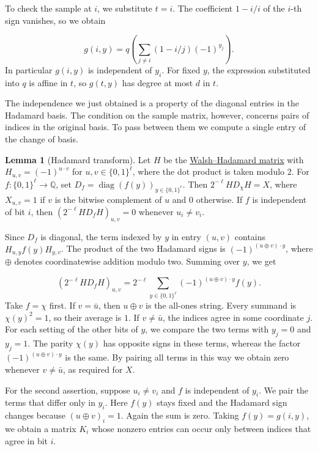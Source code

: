 \documentclass{article}
\theoremstyle{definition}
\newtheorem{lemma}[theorem]{Lemma}
\DeclareMathOperator{\diag}{diag}
\begin{document}
To check the sample at \(i\), we substitute \(t=i\). The coefficient
\(1-i/i\) of the \(i\)-th sign vanishes, so we obtain

\[
    g(i,y)=q\!\left(\sum_{j\ne i}(1-i/j)(-1)^{y_j}\right).
\]
In particular \(g(i,y)\) is independent of \(y_i\). For fixed \(y\),
the expression substituted into \(q\) is affine in \(t\), so
\(g(t,y)\) has degree at most \(d\) in \(t\).

The independence we just obtained is a property of the diagonal
entries in the Hadamard basis. The condition on the sample matrix,
however, concerns pairs of indices in the original basis. To pass
between them we compute a single entry of the change of basis.

\begin{lemma}[Hadamard transform]\label{lem:hadamard}
Let \(H\) be the \hyperref[def:hadamard]{Walsh--Hadamard matrix} with
\(H_{u,v}=(-1)^{u\cdot v}\) for \(u,v\in\{0,1\}^{\ell}\), where the dot
product is taken modulo \(2\). For \(f:\{0,1\}^{\ell}\to\mathbb Q\), set
\(D_f=\diag(f(y))_{y\in\{0,1\}^\ell}\). Then \(2^{-\ell}HD_\chi H=X\),
where \(X_{u,v}=1\) if \(v\) is the bitwise complement of \(u\) and \(0\)
otherwise. If \(f\) is independent of bit \(i\), then
\((2^{-\ell}HD_fH)_{u,v}=0\) whenever \(u_i\ne v_i\).
\end{lemma}

Since \(D_f\) is diagonal, the term indexed by \(y\) in entry
\((u,v)\) contains \(H_{u,y}f(y)H_{y,v}\). The product of the two
Hadamard signs is \((-1)^{(u\oplus v)\cdot y}\), where \(\oplus\)
denotes coordinatewise addition modulo two. Summing over \(y\), we get

\[
    (2^{-\ell}HD_fH)_{u,v}=
    2^{-\ell}\sum_{y\in\{0,1\}^\ell}(-1)^{(u\oplus v)\cdot y}f(y).
\]
Take \(f=\chi\) first. If \(v=\bar u\), then \(u\oplus v\) is the
all-ones string. Every summand is \(\chi(y)^2=1\), so their average
is \(1\). If \(v\ne\bar u\), the indices agree in some coordinate \(j\).
For each setting of the other bits of \(y\), we compare the two terms
with \(y_j=0\) and \(y_j=1\). The parity \(\chi(y)\) has opposite
signs in these terms, whereas the factor
\((-1)^{(u\oplus v)\cdot y}\) is the same. By pairing all terms in this way we obtain zero whenever
\(v\ne\bar u\), as required for \(X\).

For the second assertion, suppose \(u_i\ne v_i\) and \(f\) is
independent of \(y_i\). We pair the terms that differ only in \(y_i\).
Here \(f(y)\) stays fixed and the Hadamard sign changes because
\((u\oplus v)_i=1\). Again the sum is zero. Taking \(f(y)=g(i,y)\),
we obtain a matrix \(K_i\) whose nonzero entries can occur only
between indices that agree in bit \(i\).
\end{document}
